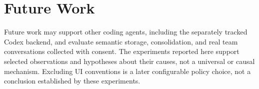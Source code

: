 \section{Future Work}

Future work may support other coding agents, including the separately tracked Codex backend, and evaluate semantic storage, consolidation, and real team conversations collected with consent. The experiments reported here support selected observations and hypotheses about their causes, not a universal or causal mechanism. Excluding UI conventions is a later configurable policy choice, not a conclusion established by these experiments.
